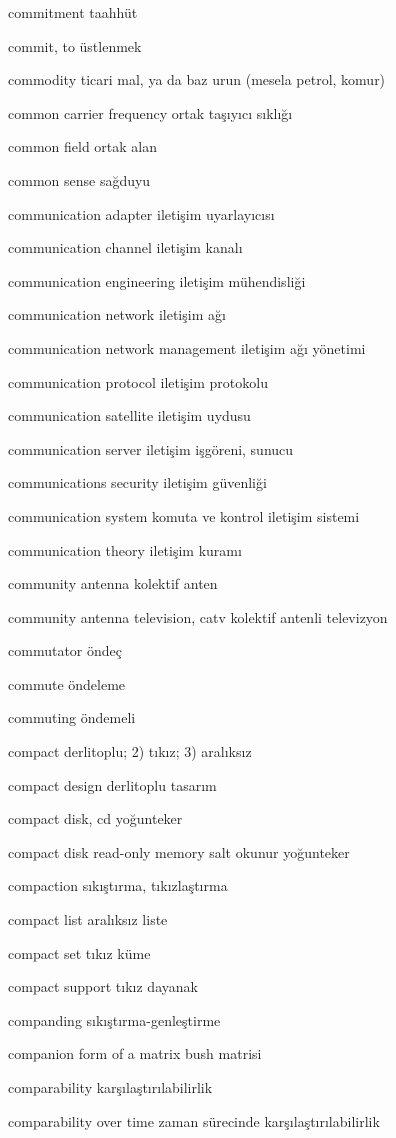 \documentclass[12pt,fleqn]{article}\usepackage{../../common}
\begin{document}
commitment taahhüt

commit, to üstlenmek

commodity ticari mal, ya da baz urun (mesela petrol, komur)

common carrier frequency ortak taşıyıcı sıklığı

common field ortak alan

common sense sağduyu

communication adapter iletişim uyarlayıcısı

communication channel iletişim kanalı

communication engineering iletişim mühendisliği

communication network iletişim ağı

communication network management iletişim ağı yönetimi

communication protocol iletişim protokolu

communication satellite iletişim uydusu

communication server iletişim işgöreni, sunucu

communications security iletişim güvenliği

communication system komuta ve kontrol iletişim sistemi

communication theory iletişim kuramı

community antenna kolektif anten

community antenna television, catv kolektif antenli televizyon

commutator öndeç

commute öndeleme

commuting öndemeli

compact derlitoplu; 2) tıkız; 3) aralıksız

compact design derlitoplu tasarım

compact disk, cd yoğunteker

compact disk read-only memory salt okunur yoğunteker

compaction sıkıştırma, tıkızlaştırma

compact list aralıksız liste

compact set tıkız küme

compact support tıkız dayanak

companding sıkıştırma-genleştirme

companion form of a matrix bush matrisi

comparability karşılaştırılabilirlik

comparability over time zaman sürecinde karşılaştırılabilirlik
\end{document}
